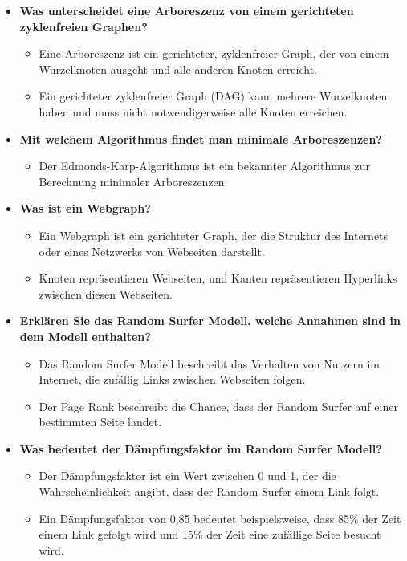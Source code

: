 \documentclass[12pt]{scrartcl}
\begin{document}
\begin{itemize}
          \pagebreak
    \item \textbf{Was unterscheidet eine Arboreszenz von einem gerichteten zyklenfreien Graphen?}
          \begin{itemize}
              \item Eine Arboreszenz ist ein gerichteter, zyklenfreier Graph, der von einem Wurzelknoten ausgeht und alle anderen Knoten erreicht.
              \item Ein gerichteter zyklenfreier Graph (DAG) kann mehrere Wurzelknoten haben und muss nicht notwendigerweise alle Knoten erreichen.
          \end{itemize}
    \item \textbf{Mit welchem Algorithmus findet man minimale Arboreszenzen?}
          \begin{itemize}
              \item Der Edmonds-Karp-Algorithmus ist ein bekannter Algorithmus zur Berechnung minimaler Arboreszenzen.
          \end{itemize}
    \item \textbf{Was ist ein Webgraph?}
          \begin{itemize}
              \item Ein Webgraph ist ein gerichteter Graph, der die Struktur des Internets oder eines Netzwerks von Webseiten darstellt.
              \item Knoten repräsentieren Webseiten, und Kanten repräsentieren Hyperlinks zwischen diesen Webseiten.
          \end{itemize}
    \item \textbf{Erklären Sie das Random Surfer Modell, welche Annahmen sind in dem Modell enthalten?}
          \begin{itemize}
              \item Das Random Surfer Modell beschreibt das Verhalten von Nutzern im Internet, die zufällig Links zwischen Webseiten folgen.
              \item Der Page Rank beschreibt die Chance, dass der Random Surfer auf einer bestimmten Seite landet.
          \end{itemize}
    \item \textbf{Was bedeutet der Dämpfungsfaktor im Random Surfer Modell?}
          \begin{itemize}
              \item Der Dämpfungsfaktor ist ein Wert zwischen 0 und 1, der die Wahrscheinlichkeit angibt, dass der Random Surfer einem Link folgt.
              \item Ein Dämpfungsfaktor von 0,85 bedeutet beispielsweise, dass 85\% der Zeit einem Link gefolgt wird und 15\% der Zeit eine zufällige Seite besucht wird.

\end{itemize}
\end{itemize}
\end{document}

